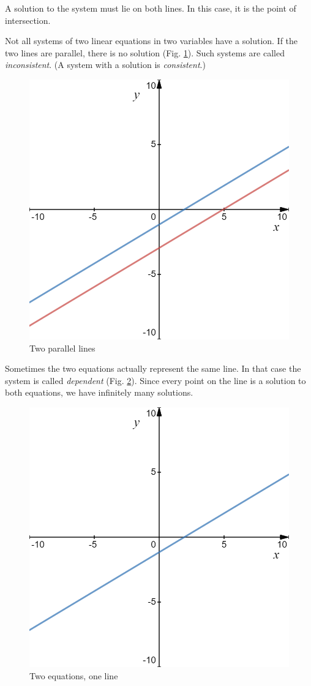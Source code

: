 \documentclass[
]{book}
\theoremstyle{definition}
\theoremstyle{definition}
\theoremstyle{definition}
\theoremstyle{definition}
\theoremstyle{remark}
\begin{document}
A solution to the system must lie on both lines. In this case, it is the point of intersection.

Not all systems of two linear equations in two variables have a solution. If the two lines are parallel, there is no solution (Fig. \ref{fig:parallel}). Such systems are called \emph{inconsistent}. (A system with a solution is \emph{consistent}.)

\begin{figure}

{\centering \includegraphics[width=0.5\linewidth]{images/soe2} 

}

\caption{Two parallel lines}\label{fig:parallel}
\end{figure}

Sometimes the two equations actually represent the same line. In that case the system is called \emph{dependent} (Fig. \ref{fig:dependent}). Since every point on the line is a solution to both equations, we have infinitely many solutions.

\begin{figure}

{\centering \includegraphics[width=0.5\linewidth]{images/soe3} 

}

\caption{Two equations, one line}\label{fig:dependent}
\end{figure}
\end{document}
